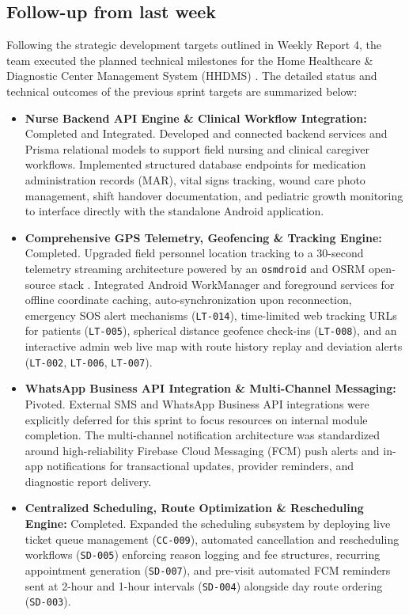 \documentclass[onecolumn,journal]{IEEEtran}
\begin{document}
	\subsection{Follow-up from last week}
	Following the strategic development targets outlined in Weekly Report 4, the team executed the planned technical milestones for the Home Healthcare \& Diagnostic Center Management System (HHDMS) \cite{srs2026}. The detailed status and technical outcomes of the previous sprint targets are summarized below:
	\begin{itemize}
		\item \textbf{Nurse Backend API Engine \& Clinical Workflow Integration:} Completed and Integrated. Developed and connected backend services and Prisma relational models to support field nursing and clinical caregiver workflows. Implemented structured database endpoints for medication administration records (MAR), vital signs tracking, wound care photo management, shift handover documentation, and pediatric growth monitoring to interface directly with the standalone Android application.
		\item \textbf{Comprehensive GPS Telemetry, Geofencing \& Tracking Engine:} Completed. Upgraded field personnel location tracking to a 30-second telemetry streaming architecture powered by an \texttt{osmdroid} and OSRM open-source stack \cite{zandbergen2009accuracy, osmdroid2024}. Integrated Android WorkManager and foreground services for offline coordinate caching, auto-synchronization upon reconnection, emergency SOS alert mechanisms (\texttt{LT-014}), time-limited web tracking URLs for patients (\texttt{LT-005}), spherical distance geofence check-ins (\texttt{LT-008}), and an interactive admin web live map with route history replay and deviation alerts (\texttt{LT-002}, \texttt{LT-006}, \texttt{LT-007}).
		\item \textbf{WhatsApp Business API Integration \& Multi-Channel Messaging:} Pivoted. External SMS and WhatsApp Business API integrations were explicitly deferred for this sprint to focus resources on internal module completion. The multi-channel notification architecture was standardized around high-reliability Firebase Cloud Messaging (FCM) push alerts \cite{firebase2024fcm} and in-app notifications for transactional updates, provider reminders, and diagnostic report delivery.
		\item \textbf{Centralized Scheduling, Route Optimization \& Rescheduling Engine:} Completed. Expanded the scheduling subsystem by deploying live ticket queue management (\texttt{CC-009}), automated cancellation and rescheduling workflows (\texttt{SD-005}) enforcing reason logging and fee structures, recurring appointment generation (\texttt{SD-007}), and pre-visit automated FCM reminders sent at 2-hour and 1-hour intervals (\texttt{SD-004}) alongside day route ordering (\texttt{SD-003}).

\end{itemize}
\end{document}
